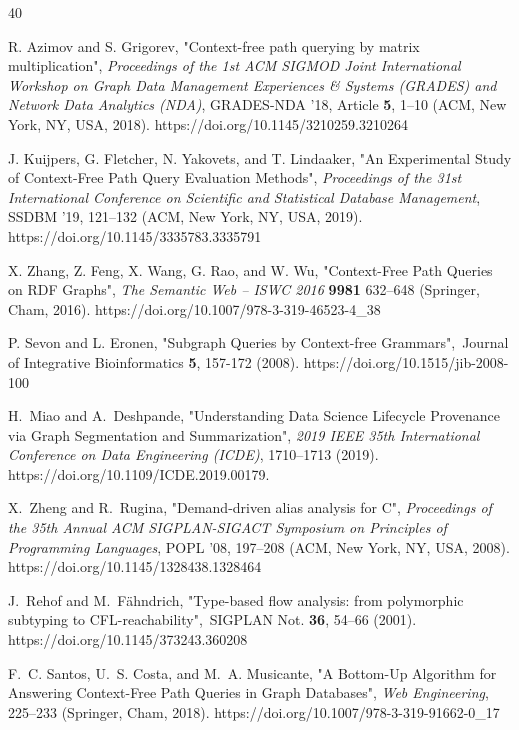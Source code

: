 \documentclass[
11pt,%
tightenlines,%
twoside,%
onecolumn,%
nobibnotes,%
nofootinbib,%
superscriptaddress,%
noshowpacs,%
longbibliography,%
centertags]%
{revtex4-2}
\begin{document}
\begin{thebibliography}{40}%

R. Azimov and S. Grigorev, "{Context-free path querying by matrix multiplication}",
\textit{Proceedings of the 1st ACM SIGMOD Joint International Workshop on Graph Data
Management Experiences \& Systems (GRADES) and Network Data Analytics (NDA)},
GRADES-NDA '18, Article \textbf{5}, 
1--10 (ACM, New York, NY, USA, 2018). 
{https://doi.org/10.1145/3210259.3210264}

J. Kuijpers, G. Fletcher, N. Yakovets, and T. Lindaaker,
"{An Experimental Study of Context-Free Path Query Evaluation Methods}",
\textit{Proceedings of the 31st International Conference on Scientific and Statistical Database Management}, SSDBM '19, 
121--132 (ACM, New York, NY, USA, 2019).
{https://doi.org/10.1145/3335783.3335791}

X. Zhang, Z. Feng, X. Wang, G. Rao, and W. Wu,
"{Context-Free Path Queries on RDF Graphs}",
\textit{The Semantic Web -- ISWC 2016}
\textbf{9981}
632--648
(Springer, Cham, 2016).
{https://doi.org/10.1007/978-3-319-46523-4\_38}

P. Sevon and L. Eronen, "{Subgraph Queries by Context-free Grammars}",\
Journal of Integrative Bioinformatics
\textbf{5}, 
157-172 (2008). 
{https://doi.org/10.1515/jib-2008-100}

H.~Miao and A.~Deshpande,
"{Understanding Data Science Lifecycle Provenance via Graph Segmentation and Summarization}",
\textit{2019 IEEE 35th International Conference on Data Engineering (ICDE)}, 
1710--1713
(2019).
{https://doi.org/10.1109/ICDE.2019.00179.}

X.~Zheng and R.~Rugina, "{Demand-driven alias analysis for C}",
\textit{Proceedings of the 35th Annual ACM SIGPLAN-SIGACT Symposium on Principles of Programming Languages}, POPL '08, 
197--208 
(ACM, New York, NY, USA, 2008). 
{https://doi.org/10.1145/1328438.1328464}

J.~Rehof and M.~F\"{a}hndrich, "{Type-based flow analysis: from polymorphic subtyping to CFL-reachability}",\ SIGPLAN Not. \textbf{36}, 
54--66 
(2001). 
{https://doi.org/10.1145/373243.360208}

F.~C. Santos, U.~S. Costa, and M.~A. Musicante,
"{A Bottom-Up Algorithm for Answering Context-Free Path Queries in Graph Databases}",
\textit{Web Engineering}, 
225--233
(Springer, Cham, 2018).
{https://doi.org/10.1007/978-3-319-91662-0\_17}


\end{thebibliography}
\end{document}
